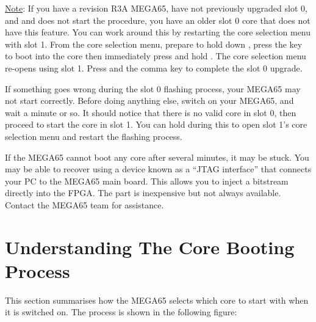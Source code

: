 \ifdefined\printmanual
\else
\underline{Note}: If you have a revision R3A MEGA65, have not previously upgraded slot 0, and \megasymbolkey and \megakey{,} does not start the procedure, you have an older slot 0 core that does not have this feature. You can work around this by restarting the core selection menu with slot 1. From the core selection menu, prepare to hold down , press the  key to boot into the core then immediately press and hold . The core selection menu re-opens using slot 1. Press \megasymbolkey and the comma key to complete the slot 0 upgrade.
\fi

If something goes wrong during the slot 0 flashing process, your MEGA65 may not start correctly. Before doing anything else, switch on your MEGA65, and wait a minute or so. It should notice that there is no valid core in slot 0, then proceed to start the core in slot 1. You can hold  during this to open slot 1's core selection menu and restart the flashing process.

If the MEGA65 cannot boot any core after several minutes, it may be stuck. You may be able to recover using a device known as a ``JTAG interface'' that connects your PC to the MEGA65 main board. This allows you to inject a bitstream directly into the FPGA. The part is inexpensive but not always available. Contact the MEGA65 team for assistance.


\newpage

\section{Understanding The Core Booting Process}

This section summarises how the MEGA65 selects which core to start with when it is switched on.
The process is shown in the following figure:

